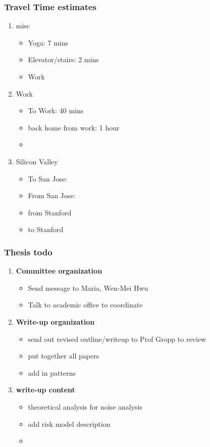 \begin{frame} 
\frametitle{Travel Time estimates} 
\begin{enumerate}
\item \small misc 
\begin{itemize} 
\item \tiny Yoga:  7 mins 
\item \tiny Elevator/stairs: 2 mins 
\item \tiny Work 
\end{itemize} 
\item \small Work 
\begin{itemize} 
\item \tiny To Work: 40 mins
\item \tiny back home from work: 1 hour
\item \tiny
\end{itemize} 
\item \small Silicon Valley
\begin{itemize} 
\item \tiny To San Jose: 
\item \tiny From San Jose:
\item \tiny from Stanford 
\item \tiny to Stanford 
\end{itemize} 
\end{enumerate}
\end{frame}  

\begin{frame} 
\frametitle{Thesis todo} 
\begin{enumerate}
\item \small \textbf{Committee organization}
\begin{itemize} 
\item \tiny Send message to Maria, Wen-Mei Hwu 
\item \tiny Talk to academic office to coordinate 
\end{itemize} 
\item \small \textbf{Write-up organization}
\begin{itemize} 
\item \tiny send out revised outline/writeup to Prof Gropp to review
\item \tiny put together all papers 
\item \tiny add in patterns 
\end{itemize} 
\item \small \textbf{write-up content} 
\begin{itemize} 
\item \tiny theoretical analysis for noise analysis
\item \tiny add risk model description
\item \tiny 
\end{itemize} 
\end{enumerate}
\end{frame} 

